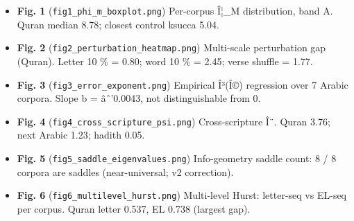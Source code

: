 \documentclass[
]{article}
\providecommand{\tightlist}{%
  \setlength{\itemsep}{0pt}\setlength{\parskip}{0pt}}
\begin{document}
\begin{itemize}
\tightlist
\item
  \textbf{Fig. 1} (\texttt{fig1\_phi\_m\_boxplot.png}) Per-corpus Î¦\_M
  distribution, band A. Quran median 8.78; closest control ksucca 5.04.
\item
  \textbf{Fig. 2} (\texttt{fig2\_perturbation\_heatmap.png}) Multi-scale
  perturbation gap (Quran). Letter 10 \% = 0.80; word 10 \% = 2.45;
  verse shuffle = 1.77.
\item
  \textbf{Fig. 3} (\texttt{fig3\_error\_exponent.png}) Empirical Î³(Î©)
  regression over 7 Arabic corpora. Slope b = âˆ'0.0043, not
  distinguishable from 0.
\item
  \textbf{Fig. 4} (\texttt{fig4\_cross\_scripture\_psi.png})
  Cross-scripture Î¨. Quran 3.76; next Arabic 1.23; hadith 0.05.
\item
  \textbf{Fig. 5} (\texttt{fig5\_saddle\_eigenvalues.png}) Info-geometry
  saddle count: 8 / 8 corpora are saddles (near-universal; v2
  correction).
\item
  \textbf{Fig. 6} (\texttt{fig6\_multilevel\_hurst.png}) Multi-level
  Hurst: letter-seq vs EL-seq per corpus. Quran letter 0.537, EL 0.738
  (largest gap).
\end{itemize}
\end{document}

